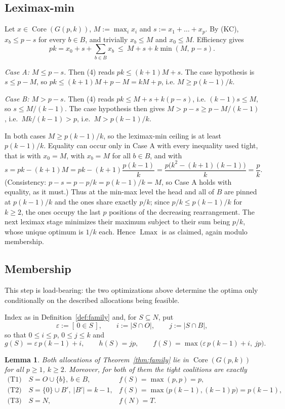 \documentclass[11pt]{article}
\newtheorem{lemma}[theorem]{Lemma}
\newcommand{\core}{\operatorname{Core}}
\newcommand{\Lmax}{\operatorname{Lmax}}
\begin{document}
\subsection{Leximax-min}

Let $x\in\core(G(p,k))$, $M:=\max_ix_i$ and $s:=x_1+\dots+x_p$.  By (KC),
$x_b\le p-s$ for every $b\in B$, and trivially $x_b\le M$ and $x_0\le M$.
Efficiency gives
\[
 pk=x_0+s+\sum_{b\in B}x_b\ \le\ M+s+k\min(M,\,p-s). \tag{4}
\]

\emph{Case A: $M\le p-s$.}  Then (4) reads $pk\le(k+1)M+s$.  The case
hypothesis is $s\le p-M$, so $pk\le(k+1)M+p-M=kM+p$, i.e.
$M\ge p(k-1)/k$.

\emph{Case B: $M>p-s$.}  Then (4) reads $pk\le M+s+k(p-s)$, i.e.
$(k-1)s\le M$, so $s\le M/(k-1)$.  The case hypothesis then gives
$M>p-s\ge p-M/(k-1)$, i.e.\ $Mk/(k-1)>p$, i.e.\ $M>p(k-1)/k$.

In both cases $M\ge p(k-1)/k$, so the leximax-min ceiling is at least
$p(k-1)/k$.  Equality can occur only in Case A with every inequality used
tight, that is with $x_0=M$, with $x_b=M$ for all $b\in B$, and with
\[
 s=pk-(k+1)M=pk-(k+1)\frac{p(k-1)}{k}=\frac{p\bigl(k^2-(k+1)(k-1)\bigr)}{k}=\frac pk .
\]
(Consistency: $p-s=p-p/k=p(k-1)/k=M$, so Case A holds with equality, as it
must.)  Thus at the min-max level the head and all of $B$ are pinned at
$p(k-1)/k$ and the ones share exactly $p/k$; since $p/k\le p(k-1)/k$ for
$k\ge2$, the ones occupy the last $p$ positions of the decreasing
rearrangement.  The next leximax stage minimizes their maximum subject to
their sum being $p/k$, whose unique optimum is $1/k$ each.  Hence $\Lmax$ is
as claimed, again modulo membership.

\subsection{Membership}\label{sec:membership}

This step is load-bearing: the two optimizations above determine the optima
only conditionally on the described allocations being feasible.

Index as in Definition~\ref{def:family} and, for $S\subseteq N$, put
\[
 \varepsilon:=[\,0\in S\,],\qquad i:=|S\cap O|,\qquad j:=|S\cap B|,
\]
so that $0\le i\le p$, $0\le j\le k$ and
\[
 g(S)=\varepsilon\,p(k-1)+i,\qquad h(S)=jp,\qquad
 f(S)=\max\bigl(\varepsilon\,p(k-1)+i,\ jp\bigr). \tag{5}
\]

\begin{lemma}\label{lem:membership}
Both allocations of Theorem~\ref{thm:family} lie in $\core(G(p,k))$ for all
$p\ge1$, $k\ge2$.  Moreover, for both of them the tight coalitions are
exactly
\[
\begin{array}{ll}
 \text{(T1)}\quad S=O\cup\{b\},\ b\in B, & f(S)=\max(p,p)=p,\\[2pt]
 \text{(T2)}\quad S=\{0\}\cup B',\ |B'|=k-1, & f(S)=\max\bigl(p(k-1),(k-1)p\bigr)=p(k-1),\\[2pt]
 \text{(T3)}\quad S=N, & f(N)=T.
\end{array}
\]
\end{lemma}
\end{document}
